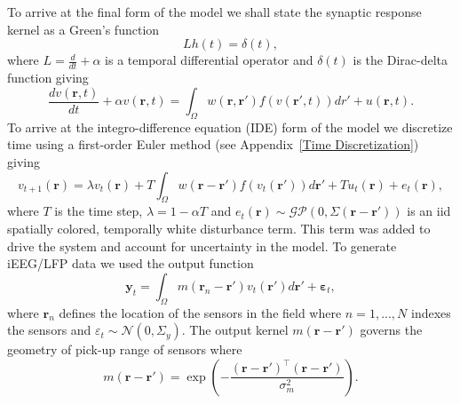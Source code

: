 \documentclass[onecolumn,draftcls]{IEEEtran}
\begin{document}
To arrive at the final form of the model we shall state the synaptic response kernel as a Green's function
\begin{equation}\label{GreensFuncDef}
	Lh\left( t \right) = \delta \left( t \right),
\end{equation}
where $L=\frac{d}{dt} + \alpha$ is a temporal differential operator and $\delta(t)$ is the Dirac-delta function giving 
\begin{equation}\label{FinalFormContinuous}
	\frac{dv\left( \mathbf{r},t \right)}{dt} + \alpha v\left( \mathbf{r},t \right) = \int_\Omega  {w\left( \mathbf{r},\mathbf{r}' \right)f\left( {v\left( \mathbf{r}',t \right)} \right)dr'} + u\left(\mathbf{r},t\right).
\end{equation}
To arrive at the integro-difference equation (IDE) form of the model we discretize time using a first-order Euler method (see Appendix~\ref{Time Discretization}) giving
\begin{equation}\label{DiscreteTimeModel}
	v_{t+1}\left(\mathbf{r}\right) = \lambda v_t\left(\mathbf{r}\right) + T \int_\Omega { w\left(\mathbf{r}-\mathbf{r}'\right) f\left(v_t\left(\mathbf{r}'\right)\right) d\mathbf{r}'} + T u_t\left(\mathbf{r}\right) + e_t\left(\mathbf{r}\right),
\end{equation} 
where $T$ is the time step, $\lambda = 1-\alpha T$ and $e_t(\mathbf{r}) \sim \mathcal{GP}\left(0,\Sigma\left(\mathbf{r}-\mathbf{r}'\right)\right)$ 
is an iid spatially colored, temporally white disturbance term. This term was added to drive the system and account for uncertainty in the model. To generate iEEG/LFP data we used the output function 
\begin{equation}
	\mathbf{y}_t = \int_{\Omega}{m\left(\mathbf{r}_n-\mathbf{r}'\right)v_t\left(\mathbf{r}'\right)d\mathbf{r}'} + \boldsymbol{\varepsilon}_t,
\end{equation}
where $\mathbf{r}_n$ defines the location of the sensors in the field where $n=1,...,N$ indexes the sensors and $\varepsilon_t \sim \mathcal{N}\left(0,\Sigma_y\right)$. The output kernel $m(\mathbf{r}-\mathbf{r}')$ governs the geometry of pick-up range of sensors where
\begin{equation}
	m\left(\mathbf{r}-\mathbf{r}'\right) = \exp{\left(-\frac{(\mathbf{r}-\mathbf{r}')^\top(\mathbf{r}-\mathbf{r}')}{\sigma_m^2}\right)}.
\end{equation}
\end{document}

